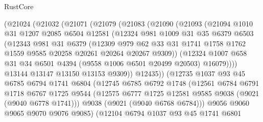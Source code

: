 \begin{lexlean}{RustCore}
\begin{coremodule}
        (@21024
          (@21032
            (@21071
              (@21079
                (@21083
                  (@21090
                    (@21093
                      (@21094
                        @1010
                        @31
                        @1207
                        @2085
                        @6504
                        @12581
                        (@12324
                          @981
                          @1009
                          @31
                          @35
                          @6379
                          @6503
                          (@12343
                            @981
                            @31
                            @6379
                            (@12309
                              @979
                              @62
                              @33
                              @31
                              @1741
                              @1758
                              @1762
                              @1559
                              @9585
                              @20258
                              @20261
                              @20264
                              @20267
                              @9309))
                          (@12324
                            @1007
                            @658
                            @31
                            @34
                            @6501
                            @4394
                            (@9558 @1006 @6501 @20499 @20503)
                            @16079))))
                    @13144
                    @13147
                    @13150
                    @13153
                    @9309))
                @12435))
            (@12735
              @1037
              @93
              @45
              @6785
              @6794
              @1741
              @6804
              (@12745
                @6785
                @6792
                @1748
                (@12561
                  @6784
                  @6791
                  @1718
                  @6767
                  @1725
                  @9544
                  (@12575 @6777 @1725 @12581 @9585 @9038 (@9021 (@9040 @6778 @1741)))
                  @9038
                  (@9021 (@9040 @6768 @6784)))
                @9056
                @9060
                @9065
                @9070
                @9076
                @9085)
              (@12104
                @6794
                @1037
                @93
                @45
                @1741
                @6801

\end{coremodule}
\end{lexlean}
